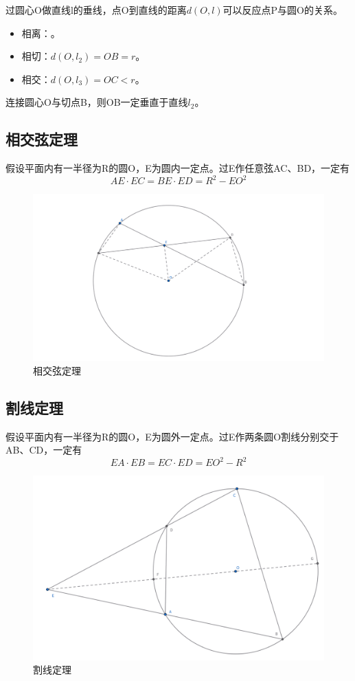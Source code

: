 过圆心O做直线l的垂线，点O到直线的距离$d(O,l)$可以反应点P与圆O的关系。
\begin{itemize}
    \item 相离：。
    \item 相切：$d(O,l_2) = OB = r$。
    \item 相交：$d(O,l_3) = OC < r$。
\end{itemize}
连接圆心O与切点B，则OB一定垂直于直线$l_2$。




\subsection{相交弦定理}
\begin{theorem}[相交弦定理]
    假设平面内有一半径为R的圆O，E为圆内一定点。过E作任意弦AC、BD，一定有
    $$
    AE \cdot EC =BE \cdot ED = R^2 - EO^2
    $$
\end{theorem}
\begin{figure}[H]
    \centering
    \includegraphics[width=0.7\linewidth]{figures/相交弦定理.png}
    \caption{相交弦定理}
\end{figure}


\subsection{割线定理}
\begin{theorem}[割线定理]
   假设平面内有一半径为R的圆O，E为圆外一定点。过E作两条圆O割线分别交于AB、CD，一定有
$$
EA \cdot EB =EC \cdot ED = EO^2 -R^2
$$
\end{theorem}
\begin{figure}[H]
    \centering
    \includegraphics[width=0.7\linewidth]{figures/割线定理.png}
    \caption{割线定理}
\end{figure}


